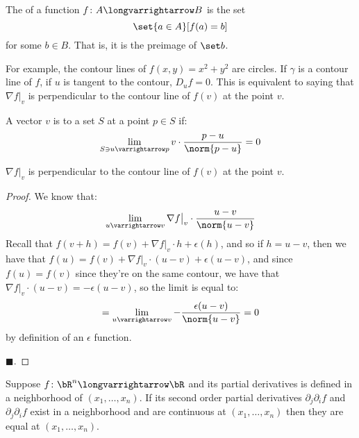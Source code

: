 \documentclass[10pt]{article}
\begin{document}
\begin{defn*}

    The  of a function $f\colon A\longvarrightarrow B$ is the set
    \[ \set{a\in A}[f(a)=b] \]
    for some $b\in B$.
    That is, it is the preimage of $\set b$.

\end{defn*}

For example, the contour lines of $f(x,y)=x^2+y^2$ are circles.
If $\gamma$ is a contour line of $f$, if $u$ is tangent to the contour, $D_uf=0$.
This is equivalent to saying that $\nabla f\big|_v$ is perpendicular to the contour line of $f(v)$ at the point $v$.

\begin{defn*}

    A vector $v$ is  to a set $S$ at a point $p\in S$ if:
        \[ \lim_{S\ni u\varrightarrow p}v\cdot\frac{p-u}{\norm{p-u}} = 0 \]

\end{defn*}

\begin{prop*}

    $\nabla f\big|_v$ is perpendicular to the contour line of $f(v)$ at the point $v$.

\end{prop*}

\begin{proof}

    We know that:
    \[ \lim_{u\varrightarrow v}\nabla f\big|_v\cdot\frac{u-v}{\norm{u-v}} \]
    Recall that $f(v+h)=f(v)+\nabla f\big|_v\cdot h+\epsilon(h)$, and so if $h=u-v$, then we have that $f(u)=f(v)+\nabla f\big|_v\cdot(u-v)+\epsilon(u-v)$, and since $f(u)=f(v)$ since they're on the
    same contour, we have that $\nabla f\big|_v\cdot(u-v)=-\epsilon(u-v)$, so the limit is equal to:
    \[ = \lim_{u\varrightarrow v}-\frac{\epsilon(u-v)}{\norm{u-v}} = 0 \]
    by definition of an $\epsilon$ function.

    \hfill$\blacksquare$.

\end{proof}

\begin{thrm*}

    Suppose $f\colon\bR^n\longvarrightarrow\bR$ and its partial derivatives is defined in a neighborhood of $(x_1,\dots,x_n)$.
    If its second order partial derivatives $\partial_j\partial_i f$ and $\partial_j\partial_i f$ exist in a neighborhood and are continuous at $(x_1,\dots,x_n)$ then they are equal at $(x_1,\dots,x_n)$.

\end{thrm*}
\end{document}
